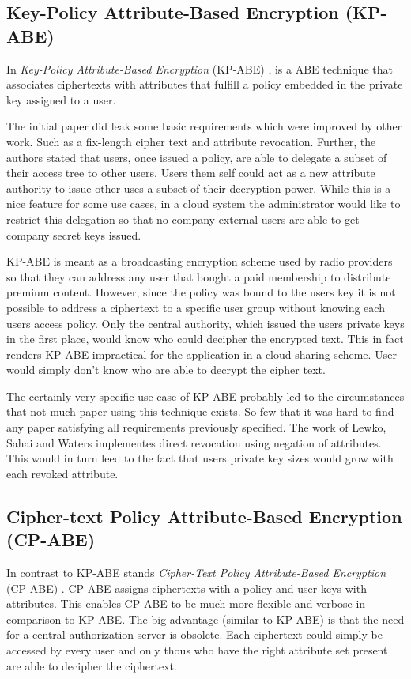 \subsection{Key-Policy Attribute-Based Encryption (\ac{KP-ABE})}
In \textit{Key-Policy Attribute-Based Encryption} (\ac{KP-ABE}) \cite{goyal2006attribute}, is a \ac{ABE} technique that associates ciphertexts with attributes that fulfill a policy embedded in the private key assigned to a user. 

The initial paper \cite{goyal2006attribute} did leak some basic requirements which were improved by other work. Such as a fix-length cipher text and attribute revocation. Further, the authors stated that users, once issued a policy, are able to delegate a subset of their access tree to other users. Users them self could act as a new attribute authority to issue other uses a subset of their decryption power. While this is a nice feature for some use cases, in a cloud system the administrator would like to restrict this delegation so that no company external users are able to get company secret keys issued. 

KP-ABE is meant as a broadcasting encryption scheme used by radio providers so that they can address any user that bought a paid membership to distribute premium content. However, since the policy was bound to the users key it is not possible to address a ciphertext to a specific user group without knowing each users access policy. Only the central authority, which issued the users private keys in the first place, would know who could decipher the encrypted text. This in fact renders \ac{KP-ABE} impractical for the application in a cloud sharing scheme. User would simply don't know who are able to decrypt the cipher text. 

The certainly very specific use case of \ac{KP-ABE} probably led to the circumstances that not much paper using this technique exists. So few that it was hard to find any paper satisfying all requirements previously specified. The work of Lewko, Sahai and Waters \cite{lewko2010revocation} implementes direct revocation using negation of attributes. This would in turn leed to the fact that users private key sizes would grow with each revoked attribute. 

\subsection{Cipher-text Policy Attribute-Based Encryption (\ac{CP-ABE})}
In contrast to KP-ABE stands \textit{Cipher-Text Policy Attribute-Based Encryption} (\ac{CP-ABE}) \cite{bethencourt2007ciphertext}. \ac{CP-ABE} assigns ciphertexts with a policy and user keys with attributes. This enables \ac{CP-ABE} to be much more flexible and verbose in comparison to \ac{KP-ABE}. The big advantage (similar to \ac{KP-ABE}) is that the need for a central authorization server is obsolete. Each ciphertext could simply be accessed by every user and only thous who have the right attribute set present are able to decipher the ciphertext. 

